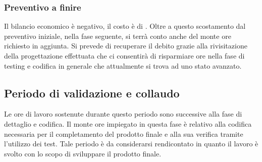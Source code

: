 \subsubsection{Preventivo a finire}
Il bilancio economico è negativo, il costo è di . Oltre a questo scostamento dal preventivo iniziale, nella fase seguente, si terrà conto anche del monte ore richiesto in aggiunta. Si prevede di recuperare il debito grazie alla rivisitazione della progettazione effettuata che ci consentirà di risparmiare ore nella fase di testing e codifica in generale che attualmente si trova ad uno stato avanzato. 



\subsection{Periodo di validazione e collaudo}
Le ore di lavoro sostenute durante questo periodo sono successive alla fase di dettaglio e codifica. Il monte ore impiegato in questa fase è relativo alla codifica necessaria per il completamento del prodotto finale e alla sua verifica tramite l'utilizzo dei test. Tale periodo è da considerarsi rendicontato in quanto il lavoro è svolto con lo scopo di sviluppare il prodotto finale.


